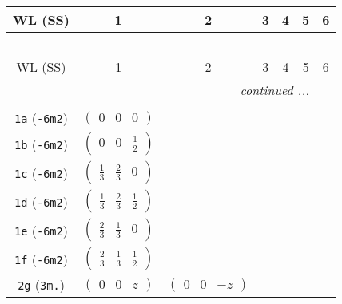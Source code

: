 \documentclass[fleqn,9pt,landscape]{jsarticle}
\begin{document}
\begin{center}
\renewcommand{\arraystretch}{1.2}
\begin{longtable}{ccccccc}
 \hline \hline
WL (SS) & 1 & 2 & 3 & 4 & 5 & 6 \\ \hline \endfirsthead

\multicolumn{6}{l}{\tablename\ \thetable{}} \\
 \hline \hline
WL (SS) & 1 & 2 & 3 & 4 & 5 & 6 \\ \hline \endhead

 \hline \hline
\multicolumn{6}{r}{\footnotesize\it continued ...} \\ \endfoot

 \hline \hline
\multicolumn{6}{r}{} \\ \endlastfoot

{\tt 1a} ({\tt -6m2}) & $ \begin{pmatrix} 0 & 0 & 0 \end{pmatrix} $ & $  $ & $  $ & $  $ & $  $ & $  $ \\ \hline
{\tt 1b} ({\tt -6m2}) & $ \begin{pmatrix} 0 & 0 & \frac{1}{2} \end{pmatrix} $ & $  $ & $  $ & $  $ & $  $ & $  $ \\ \hline
{\tt 1c} ({\tt -6m2}) & $ \begin{pmatrix} \frac{1}{3} & \frac{2}{3} & 0 \end{pmatrix} $ & $  $ & $  $ & $  $ & $  $ & $  $ \\ \hline
{\tt 1d} ({\tt -6m2}) & $ \begin{pmatrix} \frac{1}{3} & \frac{2}{3} & \frac{1}{2} \end{pmatrix} $ & $  $ & $  $ & $  $ & $  $ & $  $ \\ \hline
{\tt 1e} ({\tt -6m2}) & $ \begin{pmatrix} \frac{2}{3} & \frac{1}{3} & 0 \end{pmatrix} $ & $  $ & $  $ & $  $ & $  $ & $  $ \\ \hline
{\tt 1f} ({\tt -6m2}) & $ \begin{pmatrix} \frac{2}{3} & \frac{1}{3} & \frac{1}{2} \end{pmatrix} $ & $  $ & $  $ & $  $ & $  $ & $  $ \\ \hline
{\tt 2g} ({\tt 3m.}) & $ \begin{pmatrix} 0 & 0 & z \end{pmatrix} $ & $ \begin{pmatrix} 0 & 0 & - z \end{pmatrix} $ & $  $ & $  $ & $  $ & $  $ \\ \hline

\end{longtable}
\end{center}
\end{document}
